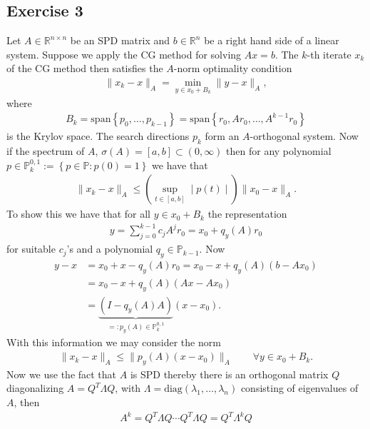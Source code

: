 \subsection{Exercise 3}
Let $A \in \mathbb{R}^{n \times n}$ be an SPD matrix and $b \in
\mathbb{R}^{n}$ be a right hand side of a linear system. Suppose we apply the
CG method for solving $Ax = b$. The $k$-th iterate $x_k$ of the CG method
then satisfies the $A$-norm optimality condition
\begin{align}
    \|x_k - x\|_A = \min_{y\in x_0 + B_k} \|y - x\|_A,
\end{align}
where
\begin{align}
    B_k = \text{span}\left\{ p_0,\ldots,p_{k-1} \right\} = \text{span}\left\{
    r_0, Ar_0, \ldots,A^{k-1}r_0\right\}
\end{align}
is the Krylov space. The search directions $p_k$ form an $A$-orthogonal
system.
\newline
Now if the spectrum of $A$, $\sigma(A) = [a, b] \subset (0, \infty)$ then
for any polynomial $p \in \mathbb{P}_k^{0, 1}:= \left\{p \in \mathbb{P}: p(0)
= 1\right\} $ we have that
\begin{align}
    \|x_k - x\|_A \le \left( \sup_{t\in[a,b]} \mid p(t) \mid \right)
    \|x_0 - x\|_A.
\end{align}
To show this we have that for all $y \in x_0 + B_k$ the representation
\begin{align}
    y = \sum_{j=0}^{k-1} c_j A^j r_0 = x_0 + q_y(A)r_0
\end{align}
for suitable $c_j$'s and a polynomial $q_y \in \mathbb{P}_{k-1}$. Now
\begin{align}
    y - x &= x_0 + x - q_y(A) r_0 = x_0 - x + q_y(A) \left( b - Ax_0
    \right)\\
          &= x_0 - x + q_y(A) \left(Ax - Ax_0 \right)\\
          &=\underbrace{\left(I - q_y(A)A \right)}_{=: p_y(A) \in
          \mathbb{P}_k^{0, 1}} (x-x_0).
\end{align}
With this information we may consider the norm
\begin{align}
    \|x_k - x\|_A \leq \|p_y(A)(x- x_0)\|_A \qquad \forall y \in x_0+B_k.
\end{align}
Now we use the fact that $A$ is SPD thereby there is an orthogonal matrix $Q$
diagonalizing $A = Q^T \Lambda Q$, with $\Lambda = \text{diag}(\lambda_1, \ldots,
\lambda_n)$ consisting of eigenvalues of $A$, then
\begin{align}
    A^k = Q^T\Lambda Q \cdots Q^T \Lambda Q = Q^T \Lambda^k Q
\end{align}
